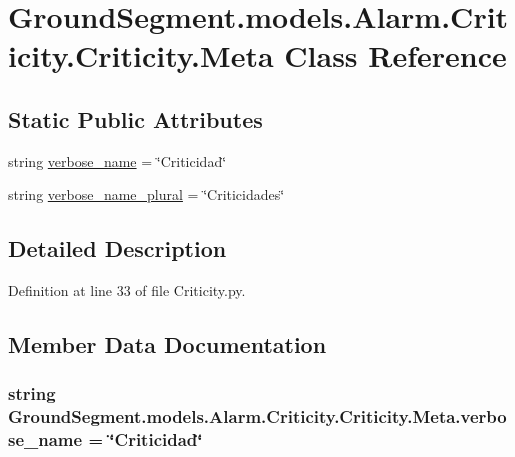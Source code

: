 \hypertarget{class_ground_segment_1_1models_1_1_alarm_1_1_criticity_1_1_criticity_1_1_meta}{}\section{Ground\+Segment.\+models.\+Alarm.\+Criticity.\+Criticity.\+Meta Class Reference}
\label{class_ground_segment_1_1models_1_1_alarm_1_1_criticity_1_1_criticity_1_1_meta}
\subsection*{Static Public Attributes}
\begin{DoxyCompactItemize}
\item 
string \hyperlink{class_ground_segment_1_1models_1_1_alarm_1_1_criticity_1_1_criticity_1_1_meta_a77545e85b931b43e2c2c1075e2dc7b89}{verbose\+\_\+name} = \char`\"{}Criticidad\char`\"{}
\item 
string \hyperlink{class_ground_segment_1_1models_1_1_alarm_1_1_criticity_1_1_criticity_1_1_meta_a27f1d87c0d59a1686bcb0026bd3bb25c}{verbose\+\_\+name\+\_\+plural} = \char`\"{}Criticidades\char`\"{}
\end{DoxyCompactItemize}


\subsection{Detailed Description}


Definition at line 33 of file Criticity.\+py.



\subsection{Member Data Documentation}
\hypertarget{class_ground_segment_1_1models_1_1_alarm_1_1_criticity_1_1_criticity_1_1_meta_a77545e85b931b43e2c2c1075e2dc7b89}{}
\subsubsection[{verbose\+\_\+name}]{\setlength{\rightskip}{0pt plus 5cm}string Ground\+Segment.\+models.\+Alarm.\+Criticity.\+Criticity.\+Meta.\+verbose\+\_\+name = \char`\"{}Criticidad\char`\"{}\hspace{0.3cm}{\ttfamily [static]}}\label{class_ground_segment_1_1models_1_1_alarm_1_1_criticity_1_1_criticity_1_1_meta_a77545e85b931b43e2c2c1075e2dc7b89}


